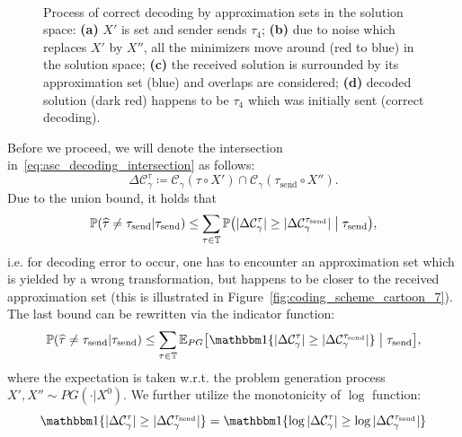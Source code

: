 \begin{figure}[th!]
\begin{subfigure}[b]{.48\textwidth}
      \caption{}
      \label{fig:coding_scheme_cartoon_4}
  \end{subfigure}
  \\[.5cm]
  \caption{Process of correct decoding by approximation sets in the solution
    space: \textbf{(a)} $X'$ is set and sender sends $\tau_4$; \textbf{(b)} due
    to noise which replaces $X'$ by $X''$, all the minimizers move around (red
    to blue) in the solution space; \textbf{(c)} the received solution is
    surrounded by its approximation set (blue) and overlaps are considered;
    \textbf{(d)} decoded solution (dark red) happens to be $\tau_4$ which was initially
    sent (correct decoding).}
  \label{fig:coding_scheme_cartoon}
\end{figure}

Before we proceed, we will denote the intersection in~\eqref{eq:asc_decoding_intersection}
as follows:
\begin{equation}
  \Delta \mathcal{C}_\gamma^\tau 
    \coloneqq \mathcal{C}_\gamma(\tau \circ X') 
      \cap \mathcal{C}_\gamma(\tau_{\text{send}} \circ X'').
\end{equation}
Due to the union bound, it holds that 
\begin{equation}
  {\mathbb{P}}(\widehat \tau \ne \tau_\text{send} | \tau_\text{send}) 
    \le \sum_{\tau \in \mathbb{T}} {\mathbb{P}} 
      \bigl(
        |\Delta \mathcal{C}_\gamma^\tau| \ge |\Delta \mathcal{C}_\gamma^{\tau_\text{send}}| \bigm| \tau_\text{send}
      \bigr),
\end{equation}
i.e. for decoding error to occur, one has to encounter an approximation set
which is yielded by a wrong transformation, but happens to be closer to the
received approximation set (this is illustrated in
Figure~\ref{fig:coding_scheme_cartoon_7}). The last bound can be rewritten via
the indicator function:
\begin{equation}
  \Prob(\hat \tau \ne \tau_\text{send} | \tau_\text{send}) 
    \le \sum_{\tau \in \mathbb{T}} \Expct_{PG}
      \bigl[
        \Ind\{|\Delta \mathcal{C}_\gamma^\tau| \ge |\Delta \mathcal{C}_\gamma^{\tau_\text{send}}|\} \bigm| \tau_\text{send}
      \bigr],
\end{equation}
where the expectation is taken w.r.t. the problem generation process $X', X''
\sim PG(\cdot | X^0)$. We further utilize the monotonicity of $\log$ function:
\begin{equation}
  \Ind\{|\Delta \mathcal{C}_\gamma^\tau| \ge |\Delta \mathcal{C}_\gamma^{\tau_\text{send}}|\} 
  = \Ind\{\log |\Delta \mathcal{C}_\gamma^\tau| \ge \log |\Delta \mathcal{C}_\gamma^{\tau_\text{send}}|\} 
\end{equation}
